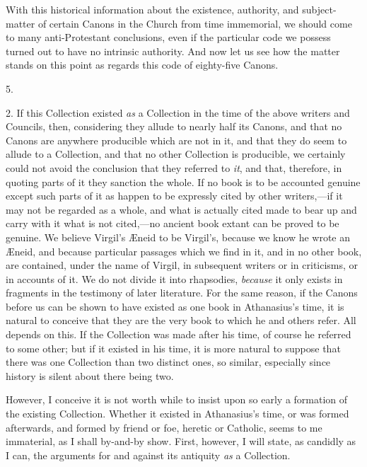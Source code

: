 With this historical information about the existence, authority,
and subject-matter of certain Canons in the Church from time
immemorial, we should come to many anti-Protestant conclusions, even
if the particular code we possess turned out to have no intrinsic
authority. And now let us see how the matter stands on this point as
regards this code of eighty-five Canons.

5.

2. If this Collection existed \emph{as} a Collection in the time of
the above writers and Councils, then, considering they allude to
nearly half its Canons, and that no Canons are anywhere producible
which are not in it, and that they do seem to allude to a Collection,
and that no other Collection is producible, we certainly could not
avoid the conclusion that they referred to \emph{it}, and that,
therefore, in quoting parts of it they sanction the whole. If no book
is to be accounted genuine except such parts of it as happen to be
expressly cited by other writers,—if it may not be regarded as a
whole, and what is actually cited made to bear up and carry with it
what is not cited,—no ancient book extant can be proved to be
genuine. We believe Virgil's Æneid to be Virgil's, because we know he
wrote an Æneid, and because particular passages which we find in it,
and in no other book, are contained, under the name of Virgil, in
subsequent writers or in criticisms, or in accounts of it. We do not
divide it into rhapsodies, \emph{because} it only exists in fragments
in the testimony of later literature. For the same reason, if
the Canons before us can be shown to have existed as one book in
Athanasius's time, it is natural to conceive that they are the very
book to which he and others refer. All depends on this. If the
Collection was made after his time, of course he referred to some
other; but if it existed in his time, it is more natural to suppose
that there was one Collection than two distinct ones, so similar,
especially since history is silent about there being two.

However, I conceive it is not worth while to insist upon so early a
formation of the existing Collection. Whether it existed in Athanasius's
time, or was formed afterwards, and formed by friend or foe, heretic
or Catholic, seems to me immaterial, as I shall by-and-by show. First,
however, I will state, as candidly as I can, the arguments for and
against its antiquity \emph{as} a Collection.

